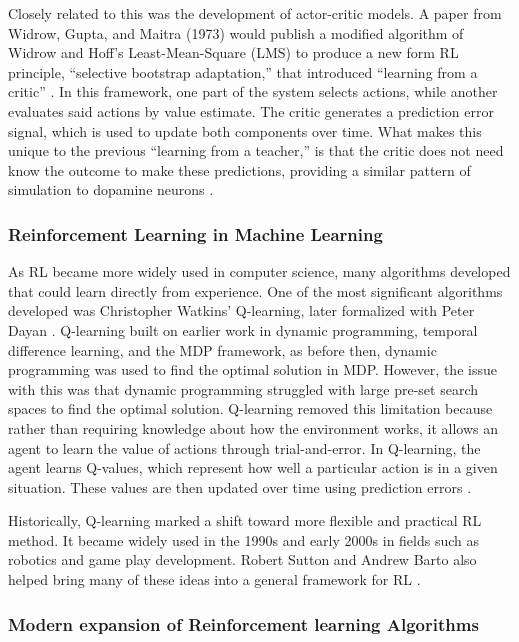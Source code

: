 \documentclass[
  authoryear,
  preprint]{elsarticle}
\begin{document}
Closely related to this was the development of actor-critic models. A
paper from Widrow, Gupta, and Maitra (1973) would publish a modified
algorithm of Widrow and Hoff's Least-Mean-Square (LMS) to produce a new
form RL principle, ``selective bootstrap adaptation,'' that introduced
``learning from a critic'' \citep{SuttonBarto2020}. In this framework,
one part of the system selects actions, while another evaluates said
actions by value estimate. The critic generates a prediction error
signal, which is used to update both components over time. What makes
this unique to the previous ``learning from a teacher,'' is that the
critic does not need know the outcome to make these predictions,
providing a similar pattern of simulation to dopamine neurons
\citep{Schultz1997, Bayer2005, SuttonBarto2020}.

\subsubsection{Reinforcement Learning in Machine
Learning}\label{reinforcement-learning-in-machine-learning}

As RL became more widely used in computer science, many algorithms
developed that could learn directly from experience. One of the most
significant algorithms developed was Christopher Watkins' Q-learning,
later formalized with Peter Dayan \citep{Watkins1992}. Q-learning built
on earlier work in dynamic programming, temporal difference learning,
and the MDP framework, as before then, dynamic programming was used to
find the optimal solution in MDP. However, the issue with this was that
dynamic programming struggled with large pre-set search spaces to find
the optimal solution. Q-learning removed this limitation because rather
than requiring knowledge about how the environment works, it allows an
agent to learn the value of actions through trial-and-error. In
Q-learning, the agent learns Q-values, which represent how well a
particular action is in a given situation. These values are then updated
over time using prediction errors
\citep{Sutton1988, SuttonBarto2020, Gottesman2019}.

Historically, Q-learning marked a shift toward more flexible and
practical RL method. It became widely used in the 1990s and early 2000s
in fields such as robotics and game play development. Robert Sutton and
Andrew Barto also helped bring many of these ideas into a general
framework for RL \citep{SuttonBarto2020, Gottesman2019}.

\subsubsection{Modern expansion of Reinforcement learning
Algorithms}\label{modern-expansion-of-reinforcement-learning-algorithms}
\end{document}
